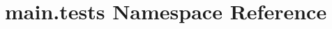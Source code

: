 \hypertarget{namespacemain_1_1tests}{}\section{main.\+tests Namespace Reference}
\label{namespacemain_1_1tests}
